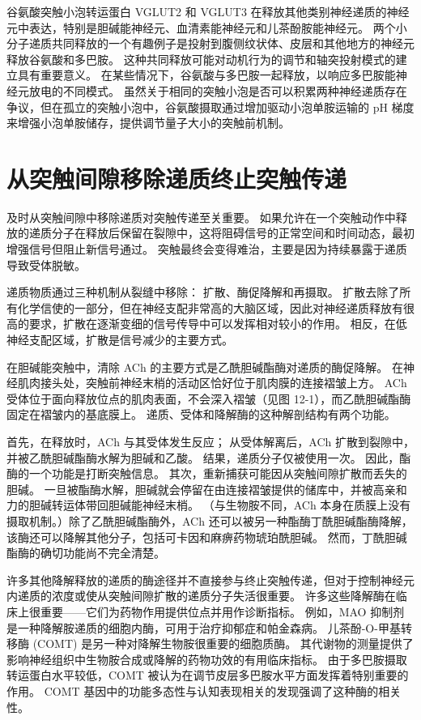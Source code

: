 谷氨酸突触小泡转运蛋白 VGLUT2 和 VGLUT3 在释放其他类别神经递质的神经元中表达，特别是胆碱能神经元、血清素能神经元和儿茶酚胺能神经元。
两个小分子递质共同释放的一个有趣例子是投射到腹侧纹状体、皮层和其他地方的神经元释放谷氨酸和多巴胺。 这种共同释放可能对动机行为的调节和轴突投射模式的建立具有重要意义。
在某些情况下，谷氨酸与多巴胺一起释放，以响应多巴胺能神经元放电的不同模式。
虽然关于相同的突触小泡是否可以积累两种神经递质存在争议，但在孤立的突触小泡中，谷氨酸摄取通过增加驱动小泡单胺运输的 pH 梯度来增强小泡单胺储存，提供调节量子大小的突触前机制。



\section{从突触间隙移除递质终止突触传递}

及时从突触间隙中移除递质对突触传递至关重要。
如果允许在一个突触动作中释放的递质分子在释放后保留在裂隙中，这将阻碍信号的正常空间和时间动态，最初增强信号但阻止新信号通过。
突触最终会变得难治，主要是因为持续暴露于递质导致受体脱敏。


递质物质通过三种机制从裂缝中移除：
扩散、酶促降解和再摄取。
扩散去除了所有化学信使的一部分，但在神经支配非常高的大脑区域，因此对神经递质释放有很高的要求，扩散在逐渐变细的信号传导中可以发挥相对较小的作用。
相反，在低神经支配区域，扩散是信号减少的主要方式。


在胆碱能突触中，清除 ACh 的主要方式是乙酰胆碱酯酶对递质的酶促降解。
在神经肌肉接头处，突触前神经末梢的活动区恰好位于肌肉膜的连接褶皱上方。
ACh 受体位于面向释放位点的肌肉表面，不会深入褶皱（见图 12-1），而乙酰胆碱酯酶固定在褶皱内的基底膜上。
递质、受体和降解酶的这种解剖结构有两个功能。


首先，在释放时，ACh 与其受体发生反应；
从受体解离后，ACh 扩散到裂隙中，并被乙酰胆碱酯酶水解为胆碱和乙酸。
结果，递质分子仅被使用一次。
因此，酯酶的一个功能是打断突触信息。
其次，重新捕获可能因从突触间隙扩散而丢失的胆碱。
一旦被酯酶水解，胆碱就会停留在由连接褶皱提供的储库中，并被高亲和力的胆碱转运体带回胆碱能神经末梢。
（与生物胺不同，ACh 本身在质膜上没有摄取机制。）除了乙酰胆碱酯酶外，ACh 还可以被另一种酯酶丁酰胆碱酯酶降解，该酶还可以降解其他分子，包括可卡因和麻痹药物琥珀酰胆碱。
然而，丁酰胆碱酯酶的确切功能尚不完全清楚。


许多其他降解释放的递质的酶途径并不直接参与终止突触传递，但对于控制神经元内递质的浓度或使从突触间隙扩散的递质分子失活很重要。
许多这些降解酶在临床上很重要——它们为药物作用提供位点并用作诊断指标。
例如，MAO 抑制剂是一种降解胺递质的细胞内酶，可用于治疗抑郁症和帕金森病。
儿茶酚-O-甲基转移酶 (COMT) 是另一种对降解生物胺很重要的细胞质酶。
其代谢物的测量提供了影响神经组织中生物胺合成或降解的药物功效的有用临床指标。
由于多巴胺摄取转运蛋白水平较低，COMT 被认为在调节皮层多巴胺水平方面发挥着特别重要的作用。
COMT 基因中的功能多态性与认知表现相关的发现强调了这种酶的相关性。


